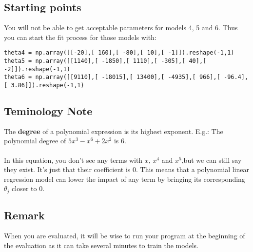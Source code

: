 \newpage
\subsection*{Starting points}
You will not be able to get acceptable parameters for models 4, 5 and 6.
Thus you can start the fit process for those models with:\\
\newline
\begin{verbatim}
theta4 = np.array([[-20],[ 160],[ -80],[ 10],[ -1]]).reshape(-1,1)
theta5 = np.array([[1140],[ -1850],[ 1110],[ -305],[ 40],[ -2]]).reshape(-1,1)
theta6 = np.array([[9110],[ -18015],[ 13400],[ -4935],[ 966],[ -96.4],[ 3.86]]).reshape(-1,1)
\end{verbatim}

\subsection*{Teminology Note}
The \textbf{degree} of a polynomial expression is its highest exponent.  
E.g.: The polynomial degree of $5x^3 - x^6 + 2 x^2$ is $6$.\\
\\
In this equation, you don't see any terms with $x$, $x^4$ and $x^5$,but we can still say they exist. It's just that their coefficient is $0$.
This means that a polynomial linear regression model can lower the impact of any term by bringing its corresponding $\theta_j$ closer to $0$.

\subsection*{Remark}
When you are evaluated, it will be wise to run your program at the beginning of the evaluation as it can take several minutes to train the models.
